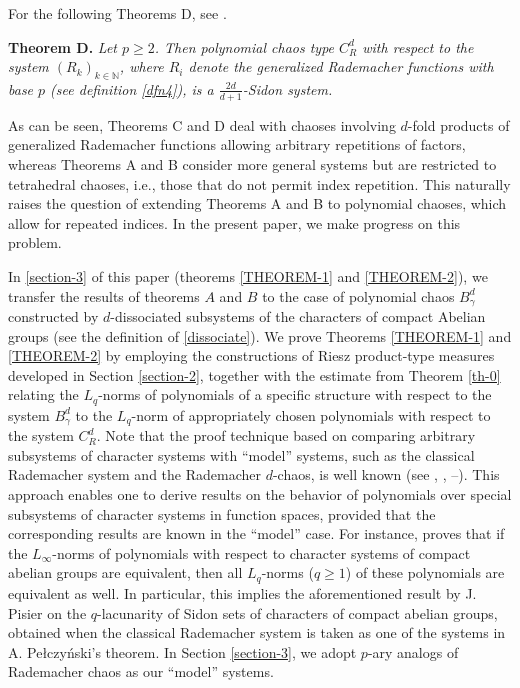 \documentclass[12pt]{article}
\begin{document}
	For the following Theorems D, see \cite{Kaz26}.
	
	{\bf Theorem D.} { \it Let $p \ge 2$.  Then polynomial chaos type $C_{R}^d$  with respect to the system $(R_k)_{k\in\mathbb{N}}$, where $R_i$ denote the generalized Rademacher functions with base $p$ (see definition \ref{dfn4}), is a $\frac{2d}{d+1}$-Sidon system.}
	
	As can be seen, Theorems C and D deal with chaoses involving $d$-fold products of generalized Rademacher functions allowing arbitrary repetitions of factors, whereas Theorems A and B consider more general systems but are restricted to tetrahedral chaoses, i.e., those that do not permit index repetition. This naturally raises the question of extending Theorems A and B to polynomial chaoses, which allow for repeated indices. In the present paper, we make progress on this problem.
	
In \ref{section-3} of this paper (theorems \ref{THEOREM-1} and \ref{THEOREM-2}), we transfer the results of theorems $A$ and $B$ to the case of polynomial chaos $B^d_{\gamma}$ constructed by $d$-dissociated subsystems of the characters of compact Abelian groups (see the definition of \ref{dissociate}). We prove Theorems \ref{THEOREM-1} and \ref{THEOREM-2} by employing the constructions of Riesz product-type measures developed in Section \ref{section-2}, together with the estimate from Theorem \ref{th-0} relating the $L_q$-norms of polynomials of a specific structure with respect to the system $B^d_{\gamma}$ to the $L_q$-norm of appropriately chosen polynomials with respect to the system $C_{R}^d$. Note that the proof technique based on comparing arbitrary subsystems of character systems with ``model'' systems, such as the classical Rademacher system and the Rademacher $d$-chaos, is well known (see \cite[Ch. 7]{Astashkin-2017}, \cite[Ch. VII]{Blei}, \cite{Pel}--\cite{jakubowski1979}). This approach enables one to derive results on the behavior of polynomials over special subsystems of character systems in function spaces, provided that the corresponding results are known in the ``model'' case. For instance, \cite{Pel} proves that if the $L_{\infty}$-norms of polynomials with respect to character systems of compact abelian groups are equivalent, then all $L_{q}$-norms ($q \ge 1$) of these polynomials are equivalent as well. In particular, this implies the aforementioned result by J. Pisier \cite{Pisier} on the $q$-lacunarity of Sidon sets of characters of compact abelian groups, obtained when the classical Rademacher system is taken as one of the systems in A. Pełczyński's theorem. In Section \ref{section-3}, we adopt $p$-ary analogs of Rademacher chaos as our ``model'' systems.
	
\end{document}
